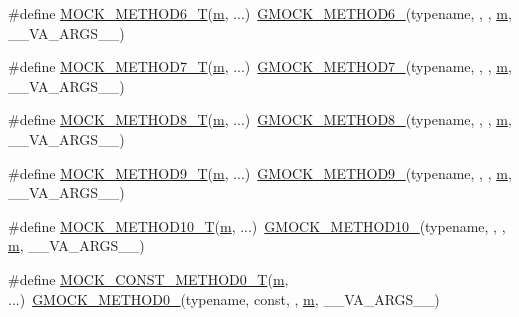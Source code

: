 \begin{DoxyCompactItemize}
\item 
\#define \hyperlink{gmock-generated-function-mockers_8h_a0d16357a0043d36b167a1c42ef33f672}{M\+O\+C\+K\+\_\+\+M\+E\+T\+H\+O\+D6\+\_\+T}(\hyperlink{app_2main_8cpp_a0d2d8836216fc94b61aa0824eb239db2}{m}, ...)~\hyperlink{gmock-generated-function-mockers_8h_ad0ca7f6973a076d0af4c953f8ed91842}{G\+M\+O\+C\+K\+\_\+\+M\+E\+T\+H\+O\+D6\+\_\+}(typename, , , \hyperlink{app_2main_8cpp_a0d2d8836216fc94b61aa0824eb239db2}{m}, \+\_\+\+\_\+\+V\+A\+\_\+\+A\+R\+G\+S\+\_\+\+\_\+)
\item 
\#define \hyperlink{gmock-generated-function-mockers_8h_a31bdd1d1448052f4122ecebf937a8f44}{M\+O\+C\+K\+\_\+\+M\+E\+T\+H\+O\+D7\+\_\+T}(\hyperlink{app_2main_8cpp_a0d2d8836216fc94b61aa0824eb239db2}{m}, ...)~\hyperlink{gmock-generated-function-mockers_8h_ab98a8399ba62b53b375c2807f4d39d2f}{G\+M\+O\+C\+K\+\_\+\+M\+E\+T\+H\+O\+D7\+\_\+}(typename, , , \hyperlink{app_2main_8cpp_a0d2d8836216fc94b61aa0824eb239db2}{m}, \+\_\+\+\_\+\+V\+A\+\_\+\+A\+R\+G\+S\+\_\+\+\_\+)
\item 
\#define \hyperlink{gmock-generated-function-mockers_8h_aa7e6573bb6a57f2a2d3c2875caeffaa3}{M\+O\+C\+K\+\_\+\+M\+E\+T\+H\+O\+D8\+\_\+T}(\hyperlink{app_2main_8cpp_a0d2d8836216fc94b61aa0824eb239db2}{m}, ...)~\hyperlink{gmock-generated-function-mockers_8h_aa84a36427c44505207b7cad5dec7ad67}{G\+M\+O\+C\+K\+\_\+\+M\+E\+T\+H\+O\+D8\+\_\+}(typename, , , \hyperlink{app_2main_8cpp_a0d2d8836216fc94b61aa0824eb239db2}{m}, \+\_\+\+\_\+\+V\+A\+\_\+\+A\+R\+G\+S\+\_\+\+\_\+)
\item 
\#define \hyperlink{gmock-generated-function-mockers_8h_a838c68cbdf422cfc703b83daf1d1f1e1}{M\+O\+C\+K\+\_\+\+M\+E\+T\+H\+O\+D9\+\_\+T}(\hyperlink{app_2main_8cpp_a0d2d8836216fc94b61aa0824eb239db2}{m}, ...)~\hyperlink{gmock-generated-function-mockers_8h_aa820171a19cc587c247dbe05cbffc55f}{G\+M\+O\+C\+K\+\_\+\+M\+E\+T\+H\+O\+D9\+\_\+}(typename, , , \hyperlink{app_2main_8cpp_a0d2d8836216fc94b61aa0824eb239db2}{m}, \+\_\+\+\_\+\+V\+A\+\_\+\+A\+R\+G\+S\+\_\+\+\_\+)
\item 
\#define \hyperlink{gmock-generated-function-mockers_8h_aa28723ba52933b5ea9a4ffa1a73d15e1}{M\+O\+C\+K\+\_\+\+M\+E\+T\+H\+O\+D10\+\_\+T}(\hyperlink{app_2main_8cpp_a0d2d8836216fc94b61aa0824eb239db2}{m}, ...)~\hyperlink{gmock-generated-function-mockers_8h_a81a48223a8771de36ef92ac6d56f6e81}{G\+M\+O\+C\+K\+\_\+\+M\+E\+T\+H\+O\+D10\+\_\+}(typename, , , \hyperlink{app_2main_8cpp_a0d2d8836216fc94b61aa0824eb239db2}{m}, \+\_\+\+\_\+\+V\+A\+\_\+\+A\+R\+G\+S\+\_\+\+\_\+)
\item 
\#define \hyperlink{gmock-generated-function-mockers_8h_a5fc82f3de9d5e83b0a6bb6cda98a8887}{M\+O\+C\+K\+\_\+\+C\+O\+N\+S\+T\+\_\+\+M\+E\+T\+H\+O\+D0\+\_\+T}(\hyperlink{app_2main_8cpp_a0d2d8836216fc94b61aa0824eb239db2}{m}, ...)~\hyperlink{gmock-generated-function-mockers_8h_ae0d290ffa58d7c624b2e3487ba1252f4}{G\+M\+O\+C\+K\+\_\+\+M\+E\+T\+H\+O\+D0\+\_\+}(typename, const, , \hyperlink{app_2main_8cpp_a0d2d8836216fc94b61aa0824eb239db2}{m}, \+\_\+\+\_\+\+V\+A\+\_\+\+A\+R\+G\+S\+\_\+\+\_\+)

\end{DoxyCompactItemize}
